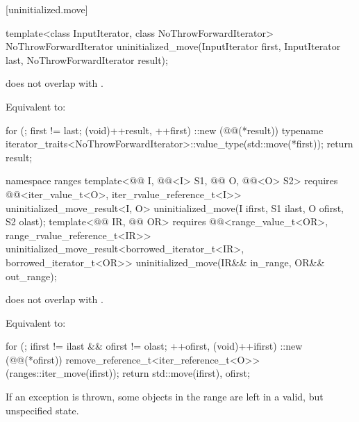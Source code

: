[uninitialized.move]{}

%
\begin{itemdecl}
template<class InputIterator, class NoThrowForwardIterator>
  NoThrowForwardIterator uninitialized_move(InputIterator first, InputIterator last,
                                            NoThrowForwardIterator result);
\end{itemdecl}

\begin{itemdescr}
\pnum
\expects
{} does not overlap with .

\pnum
\effects
Equivalent to:
\begin{codeblock}
for (; first != last; (void)++result, ++first)
  ::new (@@(*result))
    typename iterator_traits<NoThrowForwardIterator>::value_type(std::move(*first));
return result;
\end{codeblock}
\end{itemdescr}

%
\begin{itemdecl}
namespace ranges {
  template<@@ I, @@<I> S1,
           @@ O, @@<O> S2>
    requires @@<iter_value_t<O>, iter_rvalue_reference_t<I>>
    uninitialized_move_result<I, O>
      uninitialized_move(I ifirst, S1 ilast, O ofirst, S2 olast);
  template<@@ IR, @@ OR>
    requires @@<range_value_t<OR>, range_rvalue_reference_t<IR>>
    uninitialized_move_result<borrowed_iterator_t<IR>, borrowed_iterator_t<OR>>
      uninitialized_move(IR&& in_range, OR&& out_range);
}
\end{itemdecl}

\begin{itemdescr}
\pnum
\expects
{} does not overlap with .

\pnum
\effects
Equivalent to:
\begin{codeblock}
for (; ifirst != ilast && ofirst != olast; ++ofirst, (void)++ifirst)
  ::new (@@(*ofirst))
    remove_reference_t<iter_reference_t<O>>(ranges::iter_move(ifirst));
return {std::move(ifirst), ofirst};
\end{codeblock}

\pnum
\begin{note}
If an exception is thrown, some objects in the range  are
left in a valid, but unspecified state.
\end{note}
\end{itemdescr}

